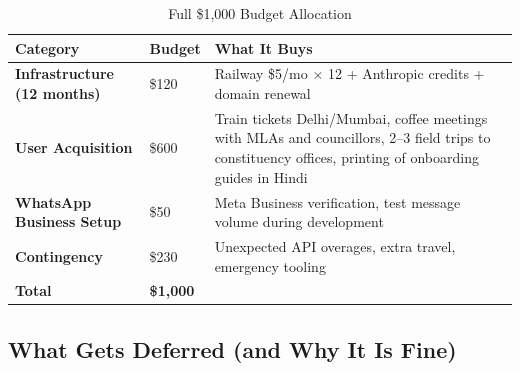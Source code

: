 \documentclass[12pt, a4paper]{article}
\begin{document}
\vspace{0.8em}

\begin{table}[ht]
\centering
\caption{Full \$1,000 Budget Allocation}
\renewcommand{\arraystretch}{1.5}
\begin{tabularx}{\textwidth}{X p{2cm} X}
\toprule
\rowcolor{pollitylightblue}
\textbf{Category} & \textbf{Budget} & \textbf{What It Buys} \\
\midrule
\textbf{Infrastructure (12 months)}  & \$120  & Railway \$5/mo $\times$ 12 + Anthropic credits + domain renewal \\
\midrule
\textbf{User Acquisition}            & \$600  & Train tickets Delhi/Mumbai, coffee meetings with MLAs and councillors, 2--3 field trips to constituency offices, printing of onboarding guides in Hindi \\
\midrule
\textbf{WhatsApp Business Setup}     & \$50   & Meta Business verification, test message volume during development \\
\midrule
\textbf{Contingency}                 & \$230  & Unexpected API overages, extra travel, emergency tooling \\
\midrule
\rowcolor{lightgreen}
\textbf{Total}                       & \textbf{\$1,000} & \\
\bottomrule
\end{tabularx}
\end{table}

\vspace{1em}

\subsection{What Gets Deferred (and Why It Is Fine)}
\end{document}
